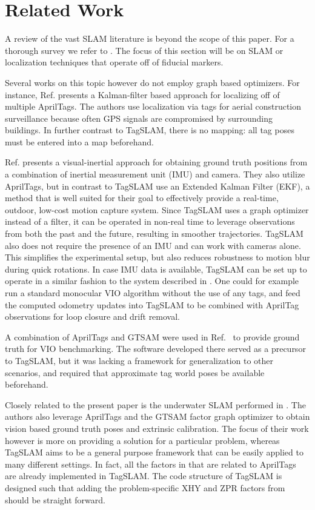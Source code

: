 \section{Related Work}
A review of the vast SLAM literature is beyond the scope of this
paper. For a thorough survey we refer to \cite{cadena2016}. The focus
of this section will be on SLAM or localization techniques that
operate off of fiducial markers.

Several works on this topic however do not employ graph based
optimizers. For instance, Ref. \cite{kayhani2019} presents a
Kalman-filter based approach for localizing off of multiple
AprilTags. The authors
use localization via tags for aerial construction surveillance because
often GPS signals are compromised by surrounding buildings. In further
contrast to TagSLAM, there is no mapping: all tag poses must be
entered into a map beforehand.

Ref. \cite{neunert2016} presents a visual-inertial approach for
obtaining ground truth positions from a combination of inertial
measurement unit (IMU) and camera. They also utilize April\-Tags, but in
contrast to TagSLAM use an Extended Kalman Filter (EKF), a method that
is well suited for their goal to effectively provide a real-time,
outdoor, low-cost motion capture system. Since TagSLAM uses a graph
optimizer instead of a filter, it can be operated in non-real time to
leverage observations from both the past and the future, resulting in
smoother trajectories. TagSLAM also does not require the presence of
an IMU and can work with cameras alone. This simplifies the
experimental setup, but also reduces robustness to motion blur during
quick rotations. In case IMU data is available, TagSLAM can be set up
to operate in a similar fashion to the system described in
\cite{neunert2016}. One could for example run a standard monocular VIO
algorithm without the use of any tags, and feed the computed odometry
updates into TagSLAM to be combined with AprilTag observations for
loop closure and drift removal.

A combination of AprilTags and GTSAM were used in
Ref.\ \cite{pfrommer2017} to provide ground truth for VIO
benchmarking. The software developed there served as a precursor to
TagSLAM, but it was lacking a framework for generalization to other
scenarios, and required that approximate tag world poses be available
beforehand.

Closely related to the present paper is the underwater SLAM performed
in \cite{westman2018}. The authors also leverage AprilTags and the
GTSAM factor graph optimizer to obtain vision based ground truth poses
and extrinsic calibration. The focus of their work however is more on
providing a solution for a particular problem, whereas TagSLAM aims to
be a general purpose framework that can be easily applied to many
different settings. In fact, all the factors in \cite{westman2018}
that are related to AprilTags are already implemented in TagSLAM. The
code structure of TagSLAM is designed such that adding the
problem-specific XHY and ZPR factors from \cite{westman2018} should be
straight forward.

